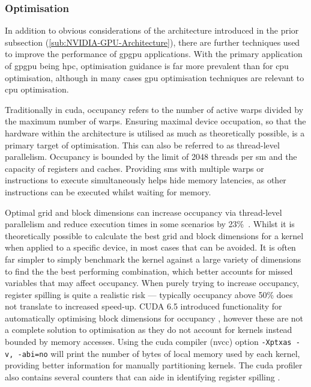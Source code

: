     \subsubsection{Optimisation}
      In addition to obvious considerations of the architecture introduced in the prior subsection (\ref{sub:NVIDIA-GPU-Architecture}), there are further techniques used to improve the performance of \gls{gpgpu} applications. With the primary application of \gls{gpgpu} being \gls{hpc}, optimisation guidance is far more prevalent than for \gls{cpu} optimisation, although in many cases \gls{gpu} optimisation techniques are relevant to \gls{cpu} optimisation.
      
      Traditionally in \gls{cuda}, occupancy refers to the number of active warps divided by the maximum number of warps. Ensuring maximal device occupation, so that the hardware within the architecture is utilised as much as theoretically possible, is a primary target of optimisation. This can also be referred to as thread-level parallelism. Occupancy is bounded by the limit of 2048 threads per \gls{sm} and the capacity of registers and caches. Providing \glspl{sm} with multiple warps or instructions to execute simultaneously helps hide memory latencies, as other instructions can be executed whilst waiting for memory.
      
      Optimal grid and block dimensions can increase occupancy via thread-level parallelism and reduce execution times in some scenarios by 23\%\ \cite{TGD13}. Whilst it is theoretically possible to calculate the best grid and block dimensions for a kernel when applied to a specific device, in most cases that can be avoided. It is often far simpler to simply benchmark the kernel against a large variety of dimensions to find the the best performing combination, which better accounts for missed variables that may affect occupancy. When purely trying to increase occupancy, register spilling is quite a realistic risk --- typically occupancy above 50\% does not translate to increased speed-up. CUDA 6.5 introduced functionality for automatically optimising block dimensions for occupancy \cite{NV_OCCUPANCY}, however these are not a complete solution to optimisation as they do not account for kernels instead bounded by memory accesses. Using the \gls{cuda} compiler (\gls{nvcc}) option \lstinline!-Xptxas -v, -abi=no! will print the number of bytes of local memory used by each kernel, providing better information for manually partitioning kernels. The \gls{cuda} profiler also contains several counters that can aide in identifying register spilling \cite{PM11}.
      
